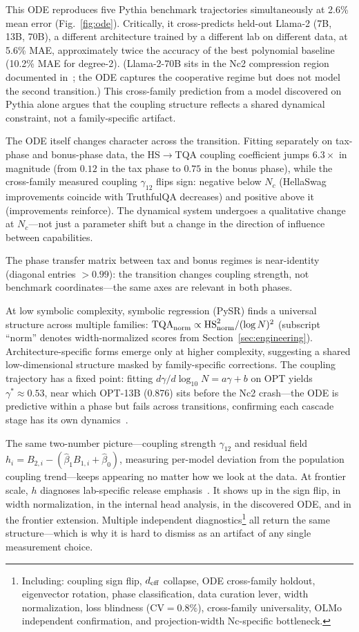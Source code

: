 \documentclass{article}
\begin{document}
This ODE reproduces five Pythia benchmark trajectories simultaneously
at 2.6\% mean error (Fig.~\ref{fig:ode}).
Critically, it cross-predicts held-out Llama-2 (7B, 13B, 70B),
a different architecture trained by a different lab on different data, at 5.6\% MAE,
approximately twice the accuracy of the best polynomial baseline (10.2\% MAE for degree-2).
(Llama-2-70B sits in the Nc2 compression region documented in~\cite{amin2026growing};
the ODE captures the cooperative regime but does not model the second transition.)
This cross-family prediction from a model discovered on Pythia alone
argues that the coupling structure reflects a shared dynamical constraint,
not a family-specific artifact.

The ODE itself changes character across the transition.
Fitting separately on tax-phase and bonus-phase data,
the HS$\to$TQA coupling coefficient jumps $6.3\times$ in magnitude
(from $0.12$ in the tax phase to $0.75$ in the bonus phase),
while the cross-family measured coupling $\gamma_{12}$ flips sign:
negative below $N_c$ (HellaSwag improvements coincide with TruthfulQA decreases)
and positive above it (improvements reinforce).
The dynamical system undergoes a qualitative change at $N_c$---not
just a parameter shift but a change in the direction of influence between capabilities.

The phase transfer matrix between tax and bonus regimes is near-identity
(diagonal entries $> 0.99$): the transition changes coupling strength,
not benchmark coordinates---the same axes are relevant in both phases.

At low symbolic complexity, symbolic regression (PySR) finds a universal structure
across multiple families: $\mathrm{TQA}_{\rm norm} \propto \mathrm{HS}_{\rm norm}^2 / (\log N)^2$
(subscript ``norm'' denotes width-normalized scores from Section~\ref{sec:engineering}).
Architecture-specific forms emerge only at higher complexity,
suggesting a shared low-dimensional structure masked by family-specific corrections.
The coupling trajectory has a fixed point:
fitting $d\gamma/d\log_{10}N = a\gamma + b$ on OPT yields $\gamma^* \approx 0.53$,
near which OPT-13B (0.876) sits before the Nc2 crash---the ODE
is predictive within a phase but fails across transitions,
confirming each cascade stage has its own dynamics~\cite{amin2026growing}.

The same two-number picture---coupling strength $\gamma_{12}$ and
residual field $h_i = B_{2,i} - (\hat{\beta}_1 B_{1,i} + \hat{\beta}_0)$,
measuring per-model deviation from the population coupling trend---keeps
appearing no matter how we look at the data.
At frontier scale, $h$ diagnoses lab-specific release emphasis~\cite{amin2026growing}.
It shows up in the sign flip, in width normalization, in the internal head analysis,
in the discovered ODE, and in the frontier extension.
Multiple independent diagnostics\footnote{Including: coupling sign flip, $d_{\rm eff}$ collapse,
ODE cross-family holdout, eigenvector rotation, phase classification,
data curation lever, width normalization, loss blindness ($\mathrm{CV} = 0.8\%$),
cross-family universality, OLMo independent confirmation,
and projection-width Nc-specific bottleneck.}
all return the same structure---which is why it is hard to dismiss
as an artifact of any single measurement choice.
\end{document}
